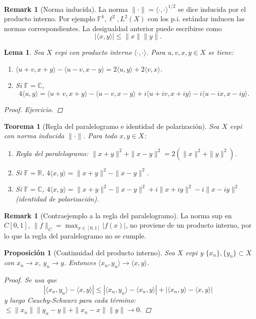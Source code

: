 \documentclass[11pt]{article}
\theoremstyle{definition}
\newtheorem{remark}[definition]{Remark}
\theoremstyle{plain}
\newtheorem{lemma}[definition]{Lema}
\newtheorem{proposition}[definition]{Proposición}
\newtheorem{theorem}[definition]{Teorema}
\begin{document}
\begin{remark}[Norma inducida]
La norma $\|\cdot\|=\langle\cdot,\cdot\rangle^{1/2}$ se dice inducida por el producto interno. Por ejemplo $\mathbb{F}^k,\ell^2,L^2(X)$ con los p.i. estándar inducen las normas correspondientes. La desigualdad anterior puede escribirse como
$$|\langle x,y\rangle|\le\|x\|\|y\|.$$
\end{remark}

\begin{lemma}
Sea $X$ evpi con producto interno $\langle\cdot,\cdot\rangle$. Para $u,v,x,y\in X$ se tiene:
\begin{enumerate}[label=\alph*)]
\item $\langle u+v,x+y\rangle-\langle u-v,x-y\rangle=2\langle u,y\rangle+2\langle v,x\rangle$.
\item Si $\mathbb{F}=\mathbb{C}$, 
$$4\langle u,y\rangle=\langle u+v,x+y\rangle-\langle u-v,x-y\rangle+i\langle u+iv,x+iy\rangle-i\langle u-ix,x-iy\rangle.$$ 
\end{enumerate}
\begin{proof}
Ejercicio.
\end{proof}
\end{lemma}

\begin{theorem}[Regla del paralelogramo e identidad de polarización]
Sea $X$ evpi con norma inducida $\|\cdot\|$. Para todo $x,y\in X$:
\begin{enumerate}[label=\alph*)]
\item Regla del paralelogramo: $\|x+y\|^2+\|x-y\|^2=2(\|x\|^2+\|y\|^2)$.
\item Si $\mathbb{F}=\mathbb{R}$, $4\langle x,y\rangle=\|x+y\|^2-\|x-y\|^2$.
\item Si $\mathbb{F}=\mathbb{C}$, $4\langle x,y\rangle=\|x+y\|^2-\|x-y\|^2+i\|x+iy\|^2-i\|x-iy\|^2$ (identidad de polarización).
\end{enumerate}
\end{theorem}

\begin{remark}[Contraejemplo a la regla del paralelogramo]
La norma sup en $C[0,1]$, $\|f\|_{C}=\max_{x\in[0,1]}|f(x)|$, no proviene de un producto interno, por lo que la regla del paralelogramo no se cumple.
\end{remark}

\begin{proposition}[Continuidad del producto interno]
Sea $X$ evpi y $\{x_n\},\{y_n\}\subset X$ con $x_n\to x$, $y_n\to y$. Entonces $\langle x_n,y_n\rangle\to\langle x,y\rangle$.
\begin{proof}
Se usa que
$$|\langle x_n,y_n\rangle-\langle x,y\rangle|\le|\langle x_n,y_n\rangle-\langle x_n,y\rangle|+|\langle x_n,y\rangle-\langle x,y\rangle|$$
y luego Cauchy-Schwarz para cada término: $\le\|x_n\|\|y_n-y\|+\|x_n-x\|\|y\|\to0$.
\end{proof}
\end{proposition}
\end{document}
